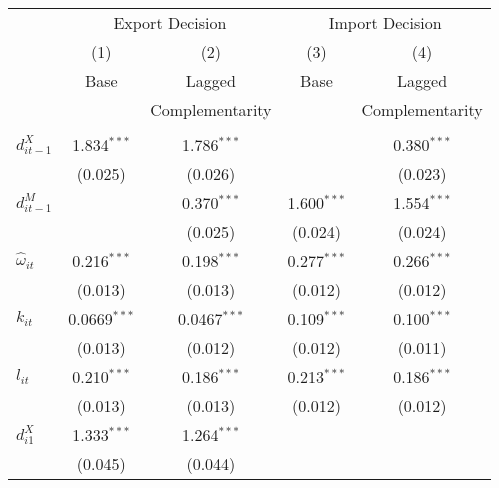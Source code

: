 \begin{center}
\begin{tabular}{l*{4}{c}}
\hline\hline&\multicolumn{2}{c}{Export
              Decision}&\multicolumn{2}{c}{Import Decision}\\
            &\multicolumn{1}{c}{(1)}&\multicolumn{1}{c}{(2)}&\multicolumn{1}{c}{(3)}&\multicolumn{1}{c}{(4)}\\
            &\multicolumn{1}{c}{Base}&\multicolumn{1}{c}{Lagged}&\multicolumn{1}{c}{Base}&\multicolumn{1}{c}{Lagged}\\
&\multicolumn{1}{c}{}&\multicolumn{1}{c}{Complementarity}&\multicolumn{1}{c}{}&\multicolumn{1}{c}{Complementarity}\\
\hline
        &                     &                     &                     &                     \\
$d_{it-1}^{X}$      &       1.834$^{***}$&       1.786$^{***}$&                     &       0.380$^{***}$\\
            &    (0.025)         &    (0.026)         &
                                    &    (0.023)         \\
[1em]
$d_{it-1}^{M}$      &                     &       0.370$^{***}$&       1.600$^{***}$&       1.554$^{***}$\\
            &                     &    (0.025)         &    (0.024)         &    (0.024)         \\
[1em]
$\hat{\omega}_{it}$       &       0.216$^{***}$&       0.198$^{***}$&       0.277$^{***}$&       0.266$^{***}$\\
            &    (0.013)         &    (0.013)         &    (0.012)         &    (0.012)         \\
[1em]
$k_{it}$        &      0.0669$^{***}$&      0.0467$^{***}$&       0.109$^{***}$&       0.100$^{***}$\\
            &    (0.013)         &    (0.012)         &    (0.012)         &    (0.011)         \\
[1em]
$l_{it}$     &       0.210$^{***}$&       0.186$^{***}$&       0.213$^{***}$&       0.186$^{***}$\\
            &    (0.013)         &    (0.013)         &    (0.012)         &    (0.012)         \\
[1em]
$d_{i1}^{X}$     &       1.333$^{***}$&       1.264$^{***}$&                     &                     \\
            &    (0.045)         &    (0.044)         &                     &                     \\

\end{tabular}
\end{center}
